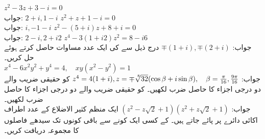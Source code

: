 \quad
$z^2-3z+3-i=0$\\
جواب:\quad
$2+i,1-i$
\quad
$z^2+z+1-i=0$\\
جواب:\quad
$i,-1-i$
\quad
$z^2-(5+i)z+8+i=0$\\
جواب:\quad
$2-i,2+i2$
\quad
$z^4-3(1+i2)z^2=8-i6$\\
جواب:\quad
$\mp (1+i), \mp(2+i)$
\quad
درج ذیل سے  کی ایک عدد مساوات حاصل کرتے ہوئے حل کریں۔\\
 $x^4-6x^2y^2+y^4=4,\quad xy(x^2-y^2)=1$\\
جواب:\quad
$z^4=4(1+i), z=\mp \sqrt[\leftroot{-2}\uproot{2}8]{32}(\cos\beta+i\sin\beta),\quad \beta=\tfrac{\pi}{16}, \tfrac{9\pi}{16}$
\quad
{} کو حقیقی  ضریب  والے دو درجی اجزاء کا حاصل ضرب لکھیں۔
\quad
{} کو حقیقی  ضریب  والے دو درجی اجزاء کا حاصل ضرب لکھیں۔\\
جواب:\quad
$(z^2-z\sqrt{2}+1)(z^2+z\sqrt{2}+1)$
\quad
ایک منظم کثیر الاضلاع  کے  عدد اطراف اکائی دائرے پر پائے جاتے ہیں۔ کے کسی ایک کونے سے باقی  کونوں تک سیدھے فاصلوں کا مجموعہ دریافت کریں۔

